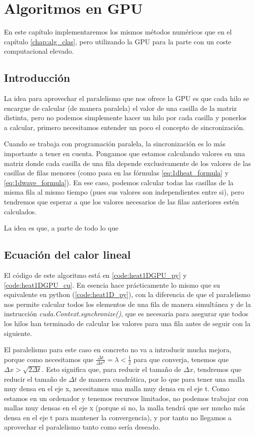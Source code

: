 \chapter{Algoritmos en GPU}\label{cap:alg_gpu}
\begin{resumen}
	En este capítulo implementaremos los mismos métodos numéricos que en el capítulo \ref{chap:alg_clas}, pero utilizando la GPU para la parte con un coste computacional elevado.
\end{resumen}
\section{Introducción}
La idea para aprovechar el paralelismo que nos ofrece la GPU es que cada hilo se encargue de calcular (de manera paralela) el valor de una casilla de la matriz distinta, pero no podemos simplemente hacer un hilo por cada casilla y ponerlos a calcular, primero necesitamos entender un poco el concepto de sincronización.

Cuando se trabaja con programación paralela, la sincronización es lo más importante a tener en cuenta. Pongamos que estamos calculando valores en una matriz donde cada casilla de una fila depende exclusivamente de los valores de las casillas de filas menores (como pasa en las fórmulas \eqref{eq:1dheat_formula} y \eqref{eq:1dwave_formula}). En ese caso, podemos calcular todas las casillas de la misma fila al mismo tiempo (pues sus valores son independientes entre si), pero tendremos que esperar a que los valores necesarios de las filas anteriores estén calculados.

La idea es que, a parte de todo lo que 

\section{Ecuación del calor lineal}
El código de este algoritmo está en \ref{code:heat1DGPU_py} y \ref{code:heat1DGPU_cu}. En esencia hace prácticamente lo mismo que su equivalente en python (\ref{code:heat1D_py}), con la diferencia de que el paralelismo nos permite calcular todos los elementos de una fila de manera simultánea y de la instrucción \textit{cuda.Context.synchronize()}, que es necesaria para asegurar que todos los hilos han terminado de calcular los valores para una fila antes de seguir con la siguiente.

El paralelismo para este caso en concreto no va a introducir mucha mejora, porque como necesitamos que $\frac{\Delta t}{\Delta x^2}=\lambda<\frac{1}{2}$ para que converja, tenemos que $\Delta x > \sqrt{2\Delta t}$. Esto significa que, para reducir el tamaño de $\Delta x$, tendremos que reducir el tamaño de $\Delta t$ de manera cuadrática, por lo que para tener una malla muy densa en el eje x, necesitamos una malla muy densa en el eje t. Como estamos en un ordenador y tenemos recursos limitados, no podemos trabajar con mallas muy densas en el eje x (porque si no, la malla tendrá que ser mucho más densa en el eje t para mantener la convergencia), y por tanto no llegamos a aprovechar el paralelismo tanto como sería deseado.

